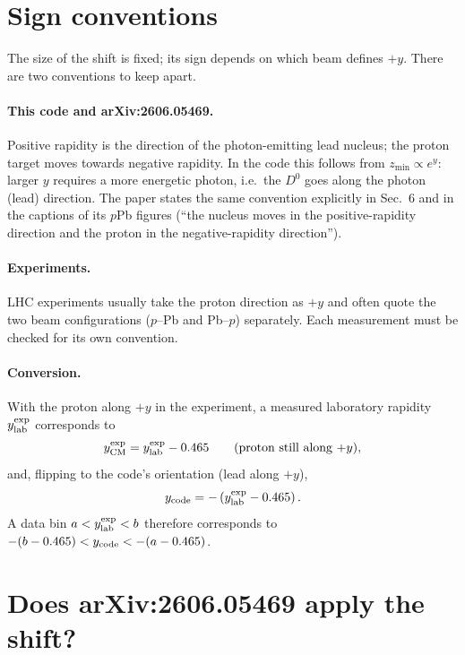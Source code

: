 \documentclass[11pt]{article}
\begin{document}
\section{Sign conventions}

The size of the shift is fixed; its sign depends on which beam defines
$+y$. There are two conventions to keep apart.

\paragraph{This code and arXiv:2606.05469.} Positive rapidity is the
direction of the photon-emitting lead nucleus; the proton target moves
towards negative rapidity. In the code this follows from
$z_{\min}\propto e^{y}$: larger $y$ requires a more energetic photon, i.e.\
the $D^0$ goes along the photon (lead) direction. The paper states the same
convention explicitly in Sec.~6 and in the captions of its $p$Pb figures
(``the nucleus moves in the positive-rapidity direction and the proton in
the negative-rapidity direction'').

\paragraph{Experiments.} LHC experiments usually take the proton direction
as $+y$ and often quote the two beam configurations ($p$--Pb and Pb--$p$)
separately. Each measurement must be checked for its own convention.

\paragraph{Conversion.} With the proton along $+y$ in the experiment, a
measured laboratory rapidity $y_{\rm lab}^{\rm exp}$ corresponds to
\begin{equation}
  y_{\rm CM}^{\rm exp} = y_{\rm lab}^{\rm exp} - 0.465
  \qquad\text{(proton still along $+y$)},
\end{equation}
and, flipping to the code's orientation (lead along $+y$),
\begin{equation}
  y_{\rm code} = -\left(y_{\rm lab}^{\rm exp} - 0.465\right).
\end{equation}
A data bin $a<y_{\rm lab}^{\rm exp}<b$ therefore corresponds to
$-(b-0.465) < y_{\rm code} < -(a-0.465)$.

\section{Does arXiv:2606.05469 apply the shift?}
\end{document}

